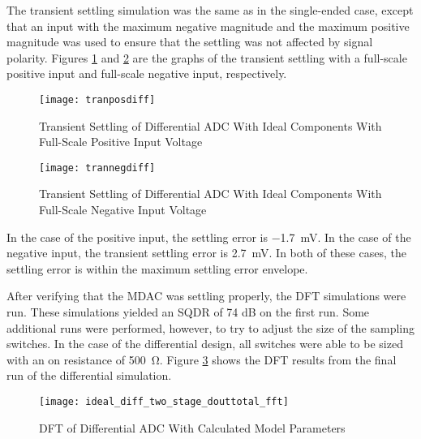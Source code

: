 The transient settling simulation was the same as in the single-ended case, except that an input with the maximum negative magnitude and the maximum positive magnitude was used to ensure that the settling was not affected by signal polarity. Figures \ref{fig:tranposdiff} and \ref{fig:trannegdiff} are the graphs of the transient settling with a full-scale positive input and full-scale negative input, respectively.
\begin{figure}[htbp]
\centering
\texttt{[image: tranposdiff]}
\caption{Transient Settling of Differential ADC With Ideal Components With Full-Scale Positive Input Voltage} 
\label{fig:tranposdiff}
\end{figure}
\begin{figure}[htbp]
\centering
\texttt{[image: trannegdiff]}
\caption{Transient Settling of Differential ADC With Ideal Components With Full-Scale Negative Input Voltage} 
\label{fig:trannegdiff}
\end{figure}
In the case of the positive input, the settling error is \SI{-1.7}{\milli\volt}. In the case of the negative input, the transient settling error is \SI{2.7}{\milli\volt}. In both of these cases, the settling error is within the maximum settling error envelope.

After verifying that the MDAC was settling properly, the DFT simulations were run. These simulations yielded an SQDR of 74 dB on the first run. Some additional runs were performed, however, to try to adjust the size of the sampling switches. In the case of the differential design, all switches were able to be sized with an on resistance of \SI{500}{\ohm}. Figure \ref{fig:fftfinaldiff} shows the DFT results from the final run of the differential simulation.
\begin{figure}[htbp]
\centering
\texttt{[image: ideal\_diff\_two\_stage\_douttotal\_fft]}
\caption{DFT of Differential ADC With Calculated Model Parameters} 
\label{fig:fftfinaldiff}
\end{figure}

